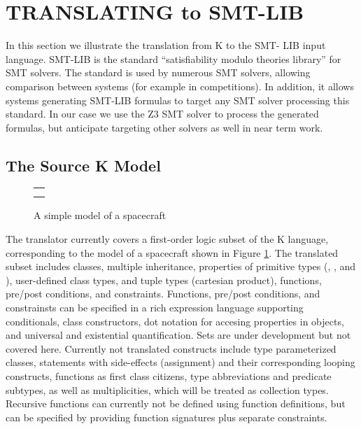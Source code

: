 \section{TRANSLATING \Klang{} to SMT-LIB}
\label{sec:k2smt}

In this section we illustrate the translation from K to the SMT- LIB
input language. SMT-LIB \cite{smt-lib} is the standard
``satisfiability modulo theories library'' for SMT solvers. The
standard is used by numerous SMT solvers, allowing comparison between
systems (for example in competitions).  In addition, it allows systems
generating SMT-LIB formulas to target any SMT solver processing this
standard. In our case we use the Z3 SMT solver \cite{de2008z3} to
process the generated formulas, but anticipate targeting other solvers
as well in near term work.

\subsection{The Source K Model}

\begin{figure}
\centering
\begin{tabular}{c}
\small
 \\ \\
\end{tabular}
\caption{A simple \Klang{} model of a spacecraft}
\label{fig:spacecraftSmt}
\end{figure}

The translator currently covers a first-order logic subset of the K
language, corresponding to the model of a spacecraft shown in Figure
\ref{fig:spacecraftSmt}.
%
The translated subset includes classes, multiple inheritance,
properties of primitive types (, , and
), user-defined class types, and tuple types (cartesian
product), functions, pre/post conditions, and constraints.  Functions,
pre/post conditions, and constrainsts can be specified in a rich
expression language supporting conditionals, class constructors, dot
notation for accesing properties in objects, and universal and
existential quantification.  Sets are under development but not
covered here. Currently not translated constructs include type
parameterized classes, statements with side-effects (assignment) and
their corresponding looping constructs, functions as first class
citizens, type abbreviations and predicate subtypes, as well as
multiplicities, which will be treated as collection types.
Recursive functions can currently not be defined using function definitions, but
can be specified by providing function signatures plus separate constraints.


